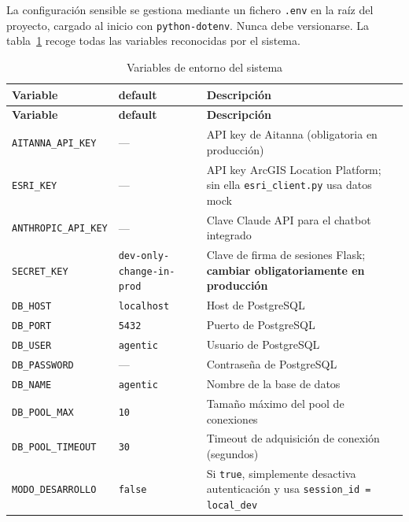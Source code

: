 \documentclass[12pt, a4paper]{article}
\begin{document}
  La configuración sensible se gestiona mediante un fichero \texttt{.env} en la
  raíz del proyecto, cargado al inicio con \texttt{python-dotenv}. Nunca debe
  versionarse. La tabla~\ref{tab:env} recoge todas las variables reconocidas por
  el sistema.

  \begin{table}[H]
  \centering
  \renewcommand{\arraystretch}{1.3}
  \begin{tabular}{lp{3.2cm}p{5.8cm}}
  \toprule
  \textbf{Variable} & \textbf{default} & \textbf{Descripción} \\
  \midrule
\textbf{Variable} & \textbf{default} & \textbf{Descripción} \\
\midrule
\texttt{AITANNA\_API\_KEY}   & —                  & API key de Aitanna (obligatoria en producción) \\
\texttt{ESRI\_KEY}           & —                  & API key ArcGIS Location Platform; sin ella \texttt{esri\_client.py} usa datos mock \\
\texttt{ANTHROPIC\_API\_KEY} & —                  & Clave Claude API para el chatbot integrado \\
\texttt{SECRET\_KEY}         & \texttt{dev-only-change-in-prod} & Clave de firma de sesiones Flask; \textbf{cambiar obligatoriamente en producción} \\
\texttt{DB\_HOST}            & \texttt{localhost}  & Host de PostgreSQL \\
\texttt{DB\_PORT}            & \texttt{5432}       & Puerto de PostgreSQL \\
\texttt{DB\_USER}            & \texttt{agentic}    & Usuario de PostgreSQL \\
\texttt{DB\_PASSWORD}        & —                  & Contraseña de PostgreSQL \\
\texttt{DB\_NAME}            & \texttt{agentic}    & Nombre de la base de datos \\
\texttt{DB\_POOL\_MAX}       & \texttt{10}         & Tamaño máximo del pool de conexiones \\
\texttt{DB\_POOL\_TIMEOUT}   & \texttt{30}         & Timeout de adquisición de conexión (segundos) \\
\texttt{MODO\_DESARROLLO}    & \texttt{false}      & Si \texttt{true}, simplemente desactiva autenticación y usa \texttt{session\_id = local\_dev} \\
\bottomrule
\end{tabular}
\caption{Variables de entorno del sistema}
\label{tab:env}
\end{table}
\end{document}
